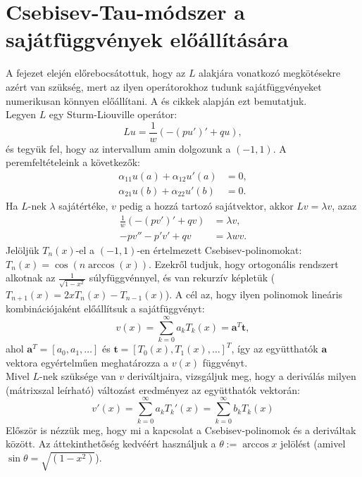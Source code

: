 \documentclass[oneside, titlepage, 12pt, a4paper]{report}
\begin{document}
\section{Csebisev-Tau-módszer a sajátfüggvények előállítására}
\label{sec:ChebTau}

A fejezet elején előrebocsátottuk, hogy az $L$ alakjára vonatkozó megkötésekre azért van szükség, mert az ilyen operátorokhoz tudunk sajátfüggvényeket numerikusan könnyen előállítani. A  \cite{ChebysevTau} és \cite{LISC} cikkek alapján ezt bemutatjuk. \\
Legyen $L$ egy Sturm-Liouville operátor:
\begin{equation*}
L u = \frac{1}{w} ( -(p u')' + q u),
\end{equation*}
és tegyük fel, hogy az intervallum amin dolgozunk a $(-1, 1)$. A peremfeltételeink a következők:
\begin{align*}
\alpha_{11}u(a) + \alpha_{12}u'(a) &= 0, \\
\alpha_{21}u(b) + \alpha_{22}u'(b) &= 0.
\end{align*}
Ha $L$-nek $\lambda$ sajátértéke, $v$ pedig a hozzá tartozó sajátvektor, akkor $L v = \lambda v$, azaz
\begin{align*}
\frac{1}{w} ( -(p v')' + q v) &= \lambda v, \\
-p v'' - p' v' + q v &= \lambda w v.
\end{align*}
Jelöljük $T_n(x)$-el a $(-1, 1)$-en értelmezett Csebisev-polinomokat: $T_n(x) = \cos(n \arccos(x))$. Ezekről tudjuk, hogy ortogonális rendszert alkotnak az $\frac{1}{\sqrt{1 - x^2}}$ súlyfüggvénnyel, és van rekurzív képletük ($T_{n+1}(x) = 2xT_n(x) - T_{n-1}(x)$). A cél az, hogy ilyen polinomok lineáris kombinációjaként előállítsuk a sajátfüggvényt:
\begin{equation*}
v(x) = \sum_{k = 0}^\infty a_k T_k(x) = \mathbf{a}^T \mathbf{t},
\end{equation*}
ahol $\mathbf{a}^T = [a_0, a_1, \dots]$ és $\mathbf{t} = [T_0(x), T_1(x), \dots]^T$, így az együtthatók $\mathbf{a}$ vektora egyértelműen meghatározza a $v(x)$ függvényt. \\
Mivel $L$-nek szüksége van $v$ deriváltjaira, vizsgáljuk meg, hogy a deriválás milyen (mátrixszal leírható) változást eredményez az együtthatók vektorán:
\begin{equation}
v'(x) = \sum_{k = 0}^\infty a_k T_k'(x) = \sum_{k = 0}^\infty b_k T_k(x) \label{eq:CT:1}
\end{equation}
Először is nézzük meg, hogy mi a kapcsolat a Csebisev-polinomok és a deriváltak között. Az áttekinthetőség kedvéért használjuk a $\theta := \arccos x$ jelölést (amivel $\sin \theta = \sqrt{(1 - x^2)}$).
\end{document}
